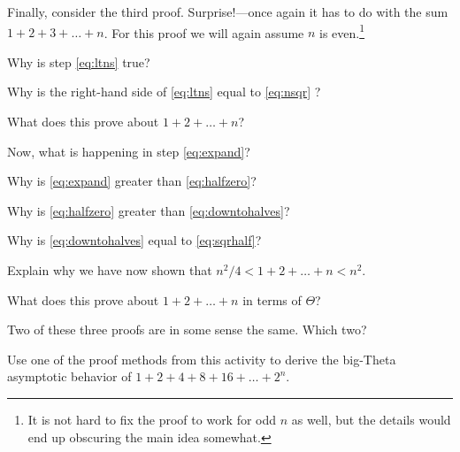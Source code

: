 \documentclass{tufte-handout}
\begin{document}
Finally, consider the third proof.  Surprise!---once again it has to
do with the sum $1 + 2 + 3 + \dots + n$.  For this proof we will
again assume $n$ is even.\footnote{It is not hard to fix the proof to work
  for odd $n$ as well, but the details would end up obscuring the main
  idea somewhat.}
\begin{questions}
  \item Why is step \eqref{eq:ltns} true?
  \item Why is the right-hand side of \eqref{eq:ltns} equal to
    \eqref{eq:nsqr} ?
  \item What does this prove about $1 + 2 + \dots + n$?
  \item Now, what is happening in step \eqref{eq:expand}?
  \item Why is \eqref{eq:expand} greater than \eqref{eq:halfzero}?
  \item Why is \eqref{eq:halfzero} greater than
    \eqref{eq:downtohalves}?
  \item Why is \eqref{eq:downtohalves} equal to \eqref{eq:sqrhalf}?
  \item Explain why we have now shown that $n^2/4 < 1 + 2 + \dots + n
    < n^2$.
  \item What does this prove about $1 + 2 + \dots + n$ in terms of
    $\Theta$?
  \item Two of these three proofs are in some sense the same.  Which
    two?
  \item Use one of the proof methods from this activity to derive the
    big-Theta asymptotic behavior of $1 + 2 + 4 + 8 + 16 + \dots + 2^n$.
  \end{questions}
\end{document}
